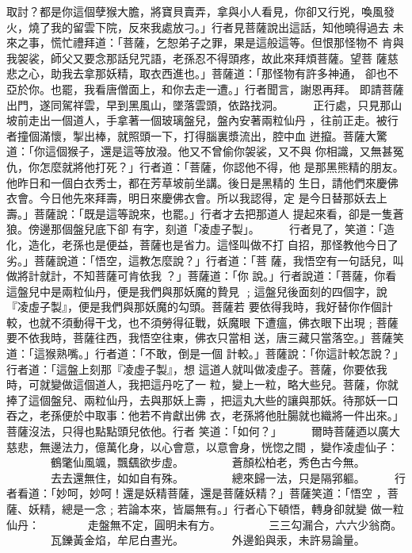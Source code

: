 \begin{pinyinscope}
{取討？都是你這個孽猴大膽，將寶貝賣弄，拿與小人看見，你卻又行兇，喚風發
火，燒了我的留雲下院，反來我處放刁。」行者見菩薩說出這話，知他曉得過去
未來之事，慌忙禮拜道：「菩薩，乞恕弟子之罪，果是這般這等。但恨那怪物不
肯與我袈裟，師父又要念那話兒咒語，老孫忍不得頭疼，故此來拜煩菩薩。望菩
薩慈悲之心，助我去拿那妖精，取衣西進也。」菩薩道：「那怪物有許多神通，
卻也不亞於你。也罷，我看唐僧面上，和你去走一遭。」行者聞言，謝恩再拜。
即請菩薩出門，遂同駕祥雲，早到黑風山，墜落雲頭，依路找洞。
　　
正行處，只見那山坡前走出一個道人，手拿著一個玻璃盤兒，盤內安著兩粒仙丹
，往前正走。被行者撞個滿懷，掣出棒，就照頭一下，打得腦裏漿流出，腔中血
迸攛。菩薩大驚道：「你這個猴子，還是這等放潑。他又不曾偷你袈裟，又不與
你相識，又無甚冤仇，你怎麼就將他打死？」行者道：「菩薩，你認他不得，他
是那黑熊精的朋友。他昨日和一個白衣秀士，都在芳草坡前坐講。後日是黑精的
生日，請他們來慶佛衣會。今日他先來拜壽，明日來慶佛衣會。所以我認得，定
是今日替那妖去上壽。」菩薩說：「既是這等說來，也罷。」行者才去把那道人
提起來看，卻是一隻蒼狼。傍邊那個盤兒底下卻 有字，刻道「凌虛子製」。
　　
行者見了，笑道：「造化，造化，老孫也是便益，菩薩也是省力。這怪叫做不打
自招，那怪教他今日了劣。」菩薩說道：「悟空，這教怎麼說？」行者道：「菩
薩，我悟空有一句話兒，叫做將計就計，不知菩薩可肯依我 ？」菩薩道：「你
說。」行者說道：「菩薩，你看這盤兒中是兩粒仙丹，便是我們與那妖魔的贄見
﹔這盤兒後面刻的四個字，說『凌虛子製』，便是我們與那妖魔的勾頭。菩薩若
要依得我時，我好替你作個計較，也就不須動得干戈，也不須勞得征戰，妖魔眼
下遭瘟，佛衣眼下出現﹔菩薩要不依我時，菩薩往西，我悟空往東，佛衣只當相
送，唐三藏只當落空。」菩薩笑道：「這猴熟嘴。」行者道：「不敢，倒是一個
計較。」菩薩說：「你這計較怎說？」行者道：「這盤上刻那『凌虛子製』，想
這道人就叫做凌虛子。菩薩，你要依我時，可就變做這個道人，我把這丹吃了一
粒，變上一粒，略大些兒。菩薩，你就捧了這個盤兒、兩粒仙丹，去與那妖上壽
，把這丸大些的讓與那妖。待那妖一口吞之，老孫便於中取事：他若不肯獻出佛
衣，老孫將他肚腸就也織將一件出來。」菩薩沒法，只得也點點頭兒依他。行者
笑道：「如何？」
　　
爾時菩薩迺以廣大慈悲，無邊法力，億萬化身，以心會意，以意會身，恍惚之間
，變作凌虛仙子：
　　　　鶴氅仙風颯，飄颻欲步虛。
　　　　蒼顏松柏老，秀色古今無。
　　　　去去還無住，如如自有殊。
　　　　總來歸一法，只是隔郛軀。
　　
行者看道：「妙呵，妙呵！還是妖精菩薩，還是菩薩妖精？」菩薩笑道：「悟空
，菩薩、妖精，總是一念﹔若論本來，皆屬無有。」行者心下頓悟，轉身卻就變
做一粒仙丹：
　　　　走盤無不定，圓明未有方。
　　　　三三勾漏合，六六少翁商。
　　　　瓦鑠黃金焰，牟尼白晝光。
　　　　外邊鉛與汞，未許易論量。

}
\end{pinyinscope}
